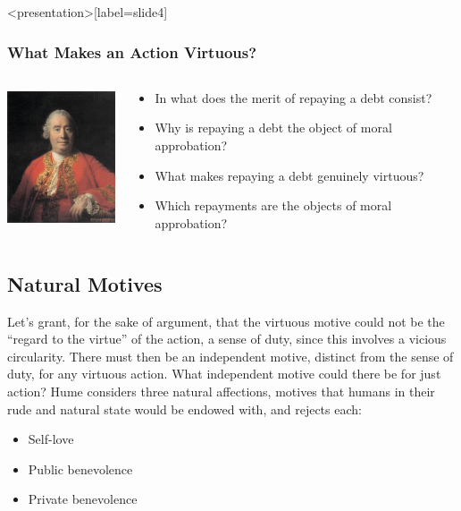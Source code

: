 \begin{frame}<presentation>[label=slide4]
    \frametitle{What Makes an Action Virtuous?}
        \begin{columns}
            \begin{column}{3cm}
                \includegraphics[height=4cm]{../../graphics/hume.jpg}
            \end{column}
            \begin{column}{7cm}
                \begin{itemize}
                    \item<2-> In what does the merit of repaying a debt consist? 
                    \item<2-> Why is repaying a debt the object of moral approbation?
                    \item<3-> What makes repaying a debt genuinely virtuous? 
                    \item<3-> Which repayments are the objects of moral approbation?
                \end{itemize}
            \end{column}
        \end{columns}
\end{frame}


\subsection{Natural Motives}\label{sec:natural_motives} %

Let’s grant, for the sake of argument, that the virtuous motive could not be the ``regard to the virtue'' of the action, a sense of duty, since this involves a vicious circularity. There must then be an independent motive, distinct from the sense of duty, for any virtuous action. What independent motive could there be for just action? Hume considers three natural affections, motives that humans in their rude and natural state would be endowed with, and rejects each:
\begin{itemize}
    \item Self-love
    \item Public benevolence
    \item Private benevolence
\end{itemize}

